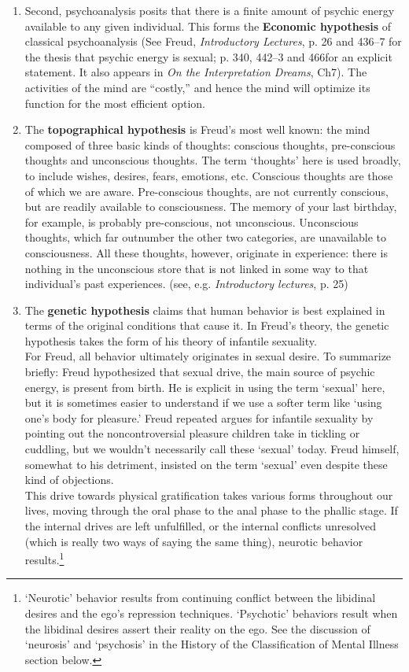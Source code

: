 \begin{refsection}
\begin{enumerate}
\item Second, psychoanalysis posits that there is a finite amount of psychic energy available to any given individual. This forms the \textbf{Economic hypothesis} of classical psychoanalysis (See Freud, \emph{Introductory Lectures}, p. 26 and 436--7 for the thesis that psychic energy is sexual; p. 340, 442--3 and 466for an explicit statement. It also appears in \emph{On the Interpretation Dreams}, Ch7). The activities of the mind are “costly,” and hence the mind will optimize its function for the most efficient option.

\item The \textbf{topographical hypothesis} is Freud's most well known: the mind composed of three basic kinds of thoughts: conscious thoughts, pre-conscious thoughts and unconscious thoughts. The term `thoughts' here is used broadly, to include wishes, desires, fears, emotions, etc. Conscious thoughts are those of which we are aware. Pre-conscious thoughts, are not currently conscious, but are readily available to consciousness. The memory of your last birthday, for example, is probably pre-conscious, not unconscious. Unconscious thoughts, which far outnumber the other two categories, are unavailable to consciousness. All these thoughts, however, originate in experience: there is nothing in the unconscious store that is not linked in some way to that individual's past experiences. (see, e.g. \emph{Introductory lectures}, p. 25)

\item The \textbf{genetic hypothesis} claims that human behavior is best explained in terms of the original conditions that cause it. In Freud's theory, the genetic hypothesis takes the form of his theory of infantile sexuality.\\
For Freud, all behavior ultimately originates in sexual desire. To summarize briefly: Freud hypothesized that sexual drive, the main source of psychic energy, is present from birth. He is explicit in using the term `sexual' here, but it is sometimes easier to understand if we use a softer term like `using one's body for pleasure.' Freud repeated argues for infantile sexuality by pointing out the noncontroversial pleasure children take in tickling or cuddling, but we wouldn't necessarily call these `sexual' today. Freud himself, somewhat to his detriment, insisted on the term `sexual' even despite these kind of objections.\\
This drive towards physical gratification takes various forms throughout our lives, moving through the oral phase to the anal phase to the phallic stage. If the internal drives are left unfulfilled, or the internal conflicts unresolved (which is really two ways of saying the same thing), neurotic behavior results.\footnote{`Neurotic' behavior results from continuing conflict between the libidinal desires and the ego's repression techniques. `Psychotic' behaviors result when the libidinal desires assert their reality on the ego. See the discussion of `neurosis' and `psychosis' in the History of the Classification of Mental Illness section below.}


\end{enumerate}
\end{refsection}
